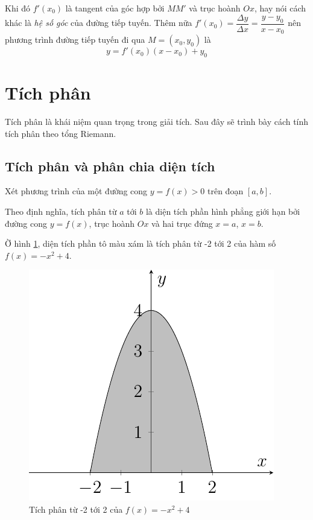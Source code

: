 Khi đó $f'(x_0)$ là tangent của góc hợp bởi $MM'$ và trục hoành $Ox$, hay nói cách khác là \textit{hệ số góc} của đường tiếp tuyến. Thêm nữa $f'(x_0) = \dfrac{\Delta y}{\Delta x} = \dfrac{y - y_0}{x - x_0}$ nên phương trình đường tiếp tuyến đi qua $M = (x_0, y_0)$ là
\begin{equation}
	y = f'(x_0) (x - x_0) + y_0
\end{equation}

\section{Tích phân}

Tích phân là khái niệm quan trọng trong giải tích. Sau đây sẽ trình bày cách tính tích phân theo tổng Riemann.

\subsection*{Tích phân và phân chia diện tích}

Xét phương trình của một đường cong $y = f(x) > 0$ trên đoạn $[a, b]$.

Theo định nghĩa, tích phân từ $a$ tới $b$ là diện tích phần hình phẳng giới hạn bởi đường cong $y = f(x)$, trục hoành $Ox$ và hai trục đứng $x = a$, $x = b$.

Ờ hình \ref{int1}, diện tích phần tô màu xám là tích phân từ -2 tới 2 của hàm số $f(x) = -x^2 + 4$.

\begin{figure}[ht]
	\centering
	\includegraphics[page=1]{analytic_geometry/riemann_sum.pdf}
	\caption{Tích phân từ -2 tới 2 của $f(x) = -x^2 + 4$}
	\label{int1}
\end{figure}

